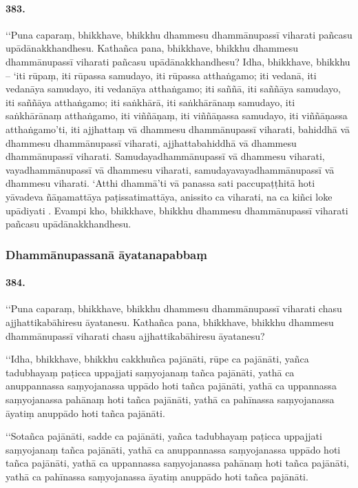 \paragraph{383.} ‘‘Puna caparaṃ, bhikkhave, bhikkhu dhammesu dhammānupassī viharati pañcasu upādānakkhandhesu. Kathañca pana, bhikkhave, bhikkhu dhammesu dhammānupassī viharati pañcasu upādānakkhandhesu? Idha, bhikkhave, bhikkhu – ‘iti rūpaṃ, iti rūpassa samudayo, iti rūpassa atthaṅgamo; iti vedanā, iti vedanāya samudayo, iti vedanāya atthaṅgamo; iti saññā, iti saññāya samudayo, iti saññāya atthaṅgamo; iti saṅkhārā, iti saṅkhārānaṃ samudayo, iti saṅkhārānaṃ atthaṅgamo, iti viññāṇaṃ, iti viññāṇassa samudayo, iti viññāṇassa atthaṅgamo’ti, iti ajjhattaṃ vā dhammesu dhammānupassī viharati, bahiddhā vā dhammesu dhammānupassī viharati, ajjhattabahiddhā vā dhammesu dhammānupassī viharati. Samudayadhammānupassī vā dhammesu viharati, vayadhammānupassī vā dhammesu viharati, samudayavayadhammānupassī vā dhammesu viharati. ‘Atthi dhammā’ti vā panassa sati paccupaṭṭhitā hoti yāvadeva ñāṇamattāya paṭissatimattāya, anissito ca viharati, na ca kiñci loke upādiyati . Evampi kho, bhikkhave, bhikkhu dhammesu dhammānupassī viharati pañcasu upādānakkhandhesu.


\subsubsection{Dhammānupassanā āyatanapabbaṃ}

\paragraph{384.} ‘‘Puna caparaṃ, bhikkhave, bhikkhu dhammesu dhammānupassī viharati chasu ajjhattikabāhiresu āyatanesu. Kathañca pana, bhikkhave, bhikkhu dhammesu dhammānupassī viharati chasu ajjhattikabāhiresu āyatanesu?

‘‘Idha, bhikkhave, bhikkhu cakkhuñca pajānāti, rūpe ca pajānāti, yañca tadubhayaṃ paṭicca uppajjati saṃyojanaṃ tañca pajānāti, yathā ca anuppannassa saṃyojanassa uppādo hoti tañca pajānāti, yathā ca uppannassa saṃyojanassa pahānaṃ hoti tañca pajānāti, yathā ca pahīnassa saṃyojanassa āyatiṃ anuppādo hoti tañca pajānāti.

‘‘Sotañca pajānāti, sadde ca pajānāti, yañca tadubhayaṃ paṭicca uppajjati saṃyojanaṃ tañca pajānāti, yathā ca anuppannassa saṃyojanassa uppādo hoti tañca pajānāti, yathā ca uppannassa saṃyojanassa pahānaṃ hoti tañca pajānāti, yathā ca pahīnassa saṃyojanassa āyatiṃ anuppādo hoti tañca pajānāti.

